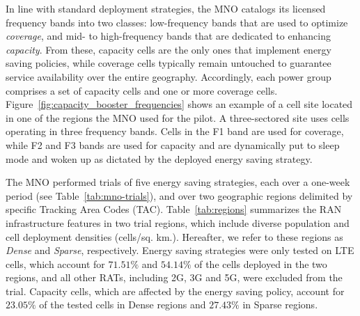 In line with standard deployment strategies, the MNO catalogs its licensed frequency bands into two classes: low-frequency bands that are used to optimize \textit{coverage}, and mid- to high-frequency bands that are dedicated to enhancing \textit{capacity}. From these, capacity cells are the only ones that implement energy saving policies, while coverage cells typically remain untouched to guarantee service availability over the entire geography. Accordingly, each power group comprises a set of capacity cells and one or more coverage cells. %
Figure~\ref{fig:capacity_booster_frequencies} shows an example of a cell site located in one of the regions the MNO used for the pilot. A three-sectored site uses cells operating in three frequency bands. Cells in the F1 band are used for coverage, while F2 and F3 bands are used for capacity and are dynamically 
put to sleep mode and woken up as dictated by the deployed energy saving strategy. %

The MNO performed trials of five energy saving strategies, each over a one-week period (see Table~\ref{tab:mno-trials}), and over two geographic regions delimited by specific Tracking Area Codes (TAC). Table~\ref{tab:regions} summarizes the RAN infrastructure features in two trial regions, which include diverse population and cell deployment densities (cells/sq. km.). Hereafter, we refer to these regions as \textit{Dense} and \textit{Sparse}, respectively. 
Energy saving strategies were only tested on LTE cells, which account for $71.51\%$ and $54.14\%$ of the cells deployed in the two regions, and all other RATs, including 2G, 3G and 5G, were excluded from the trial. Capacity cells, which are affected by the energy saving policy, account for $23.05\%$ of the tested cells in Dense regions and $27.43\%$ in Sparse regions.



